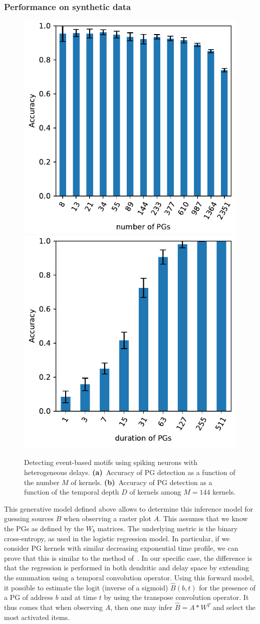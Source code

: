 \documentclass[default]{sn-jnl}%
\theoremstyle{thmstyleone}%
\theoremstyle{thmstyletwo}%
\theoremstyle{thmstylethree}%
\begin{document}
\subsubsection{Performance on synthetic data}
%
\begin{figure}[t!]
    \centering
    \includegraphics[width=0.490\linewidth]{figures/figure_N_PGs.pdf}
    \includegraphics[width=0.490\linewidth]{figures/figure_N_PG_time.pdf}
	    \caption{Detecting event-based motifs using spiking neurons with heterogeneous delays. 
	    {\bf (a)}~Accuracy of PG detection as a function of the number $M$ of kernels.
	    {\bf (b)}~Accuracy of PG detection as a function of the temporal depth $D$ of kernels among $M=144$ kernels.
	    	     }
    \label{fig:model_results}
\end{figure}
% 
This generative model defined above allows to determine this inference model for guessing sources $B$ when observing a raster plot $A$. This assumes that we know the PGs as defined by the $W_b$ matrices. The underlying metric is the binary cross-entropy, as used in the logistic regression model. In particular, if we consider PG kernels with similar decreasing exponential time profile, we can prove that this is similar to the method of~\citet{berens_fast_2012}. In our specific case, the difference is that the regression is performed in both dendritic and delay space by extending the summation using a temporal convolution operator. Using this forward model, it possible to estimate the logit (inverse of a sigmoid) $\hat{B}(b, t)$ for the presence of a PG of address $b$ and at time $t$ by using the transpose convolution operator. It thus comes that when observing $A$, then one may infer $\hat{B} = A \ast W^T$ and select the most activated items. 
\end{document}
